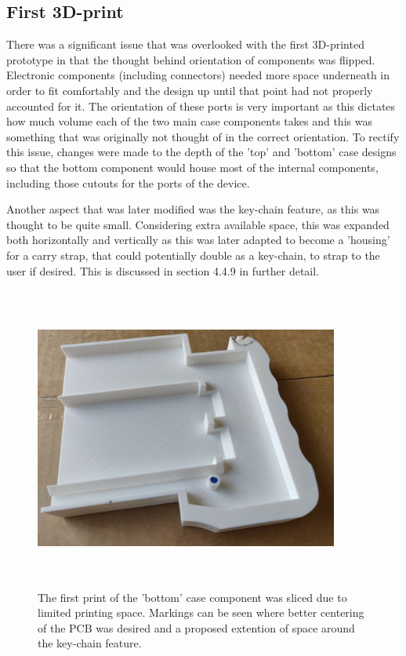 \subsection{First 3D-print}

There was a significant issue that was overlooked with the first 3D-printed prototype in that the thought behind orientation of components was flipped.
Electronic components (including connectors) needed more space underneath in order to fit comfortably and the design up until that point had not properly accounted for it.
The orientation of these ports is very important as this dictates how much volume each of the two main case components takes and this was something that was originally not thought of in the correct orientation.
To rectify this issue, changes were made to the depth of the 'top' and 'bottom' case designs so that the bottom component would house most of the internal components, including those cutouts for the ports of the device.

Another aspect that was later modified was the key-chain feature, as this was thought to be quite small.
Considering extra available space, this was expanded both horizontally and vertically as this was later adapted to become a 'housing' for a carry strap, that could potentially double as a key-chain, to strap to the user if desired.
This is discussed in section 4.4.9 in further detail.

\begin{figure} [h]
    \centering
    \includegraphics[width=10cm,height=10cm,keepaspectratio]{Figures/firstprint.png}
    \caption{The first print of the 'bottom' case component was sliced due to limited printing space. Markings can be seen where better centering of the PCB was desired and a proposed extention of space around the key-chain feature.}
    \label{fig:First}
\end{figure}

